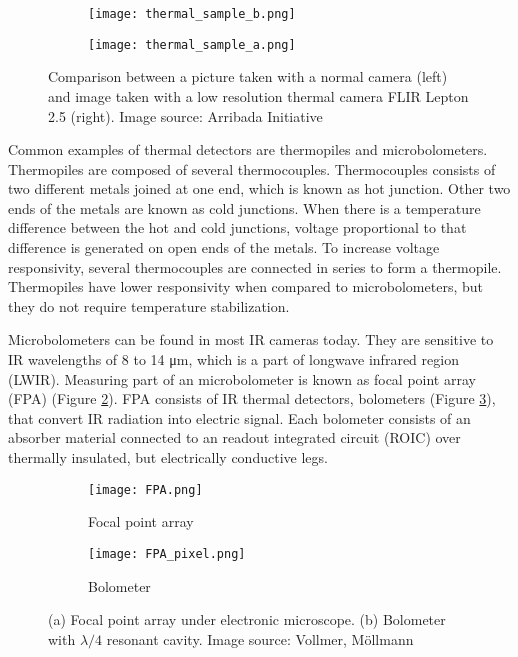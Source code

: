 \begin{figure}[ht]
    \begin{subfigure}{0.5\textwidth}
        \centering
        \texttt{[image: thermal\_sample\_b.png]} 
    \end{subfigure}
    \begin{subfigure}{0.5\textwidth}
        \centering
        \texttt{[image: thermal\_sample\_a.png]}
    \end{subfigure}
    \caption{Comparison between a picture taken with a normal camera (left) and image taken with a low resolution thermal camera FLIR Lepton 2.5 (right). Image source: Arribada Initiative\cite{thermal_comparison}}
    \label{thermal_comparison}
\end{figure}

Common examples of thermal detectors are thermopiles and microbolometers. 
Thermopiles are composed of several thermocouples.
Thermocouples consists of two different metals joined at one end, which is known as hot junction.
Other two ends of the metals are known as cold junctions.
When there is a temperature difference between the hot and cold junctions, voltage proportional to that difference is generated on open ends of the metals.
To increase voltage responsivity, several thermocouples are connected in series to form a thermopile\cite{thermal_book}.
Thermopiles have lower responsivity when compared to microbolometers, but they do not require temperature stabilization\cite{thermal_book}.

Microbolometers can be found in most IR cameras today\cite{thermal_book}. 
They are sensitive to IR wavelengths of 8 to 14 \si{\micro\meter}, which is a part of longwave infrared region (LWIR)\cite{thermal_book}.
Measuring part of an microbolometer is known as focal point array (FPA) (Figure \ref{FPA}).
FPA consists of IR thermal detectors, bolometers (Figure \ref{FPA_pixel}), that convert IR radiation into electric signal.
Each bolometer consists of an absorber material connected to an readout integrated circuit (ROIC) over thermally insulated, but electrically conductive legs\cite{thermal_article}.
\newline

\begin{figure}[h]
    \begin{subfigure}{0.5\textwidth}
        \centering
        \texttt{[image: FPA.png]} 
        \caption{Focal point array}
        \label{FPA}
    \end{subfigure}
    \begin{subfigure}{0.5\textwidth}
        \centering
        \texttt{[image: FPA\_pixel.png]}
        \caption{Bolometer}
        \label{FPA_pixel}
    \end{subfigure}

    \caption{(a) Focal point array under electronic microscope. (b) Bolometer with $\lambda /4$ resonant cavity. Image source: Vollmer, Möllmann\cite{thermal_book}}
    \label{FPA_microbolo}
\end{figure}

